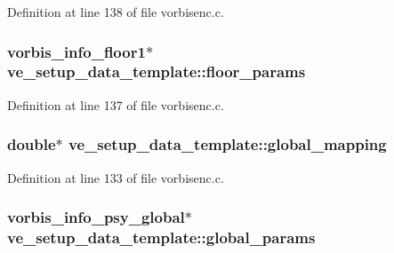 Definition at line 138 of file vorbisenc.\+c.

\subsubsection[{\texorpdfstring{floor\+\_\+params}{floor_params}}]{ {\bf vorbis\+\_\+info\+\_\+floor1}$\ast$ ve\+\_\+setup\+\_\+data\+\_\+template\+::floor\+\_\+params}\hypertarget{structve__setup__data__template_aad9d08b4c6963f216ab062c84c033ed1}{}\label{structve__setup__data__template_aad9d08b4c6963f216ab062c84c033ed1}


Definition at line 137 of file vorbisenc.\+c.

\subsubsection[{\texorpdfstring{global\+\_\+mapping}{global_mapping}}]{ double$\ast$ ve\+\_\+setup\+\_\+data\+\_\+template\+::global\+\_\+mapping}\hypertarget{structve__setup__data__template_a19f141e94bc9fcdf1043e2ec1be15a4c}{}\label{structve__setup__data__template_a19f141e94bc9fcdf1043e2ec1be15a4c}


Definition at line 133 of file vorbisenc.\+c.

\subsubsection[{\texorpdfstring{global\+\_\+params}{global_params}}]{ {\bf vorbis\+\_\+info\+\_\+psy\+\_\+global}$\ast$ ve\+\_\+setup\+\_\+data\+\_\+template\+::global\+\_\+params}\hypertarget{structve__setup__data__template_af87eefec058f48e5772e249923a11b22}{}\label{structve__setup__data__template_af87eefec058f48e5772e249923a11b22}


